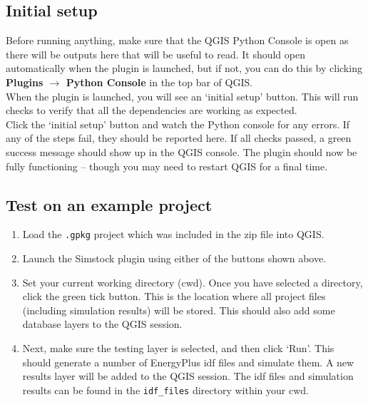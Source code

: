 \documentclass{article}
\begin{document}
\subsection{Initial setup}
Before running anything, make sure that the QGIS Python Console is open as there will be outputs here that will be useful to read. It should open automatically when the plugin is launched, but if not, you can do this by clicking \textbf{Plugins $\rightarrow$ Python Console} in the top bar of QGIS. \\

When the plugin is launched, you will see an `initial setup' button. This will run checks to verify that all the dependencies are working as expected. \\

Click the `initial setup' button and watch the Python console for any errors. If any of the steps fail, they should be reported here. If all checks passed, a green success message should show up in the QGIS console. The plugin should now be fully functioning -- though you may need to restart QGIS for a final time.

\subsection{Test on an example project}
\begin{enumerate}
    \item Load the \texttt{.gpkg} project which was included in the zip file into QGIS.
    \item Launch the Simstock plugin using either of the buttons shown above.
    \item Set your current working directory (cwd). Once you have selected a directory, click the green tick button. This is the location where all project files (including simulation results) will be stored. This should also add some database layers to the QGIS session.
    \item Next, make sure the testing layer is selected, and then click `Run'. This should generate a number of EnergyPlus idf files and simulate them. A new results layer will be added to the QGIS session. The idf files and simulation results can be found in the \texttt{idf\_files} directory within your cwd.
\end{enumerate}
\clearpage
\end{document}
